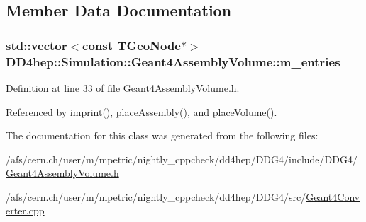 \subsection{Member Data Documentation}
\hypertarget{class_d_d4hep_1_1_simulation_1_1_geant4_assembly_volume_a0d910d90aa651bf5ccb3816c5ce3641a}{
\subsubsection[{m\_\-entries}]{\setlength{\rightskip}{0pt plus 5cm}std::vector$<$const TGeoNode$\ast$$>$ {\bf DD4hep::Simulation::Geant4AssemblyVolume::m\_\-entries}}}
\label{class_d_d4hep_1_1_simulation_1_1_geant4_assembly_volume_a0d910d90aa651bf5ccb3816c5ce3641a}


Definition at line 33 of file Geant4AssemblyVolume.h.

Referenced by imprint(), placeAssembly(), and placeVolume().

The documentation for this class was generated from the following files:\begin{DoxyCompactItemize}
\item 
/afs/cern.ch/user/m/mpetric/nightly\_\-cppcheck/dd4hep/DDG4/include/DDG4/\hyperlink{_geant4_assembly_volume_8h}{Geant4AssemblyVolume.h}\item 
/afs/cern.ch/user/m/mpetric/nightly\_\-cppcheck/dd4hep/DDG4/src/\hyperlink{_geant4_converter_8cpp}{Geant4Converter.cpp}\end{DoxyCompactItemize}
